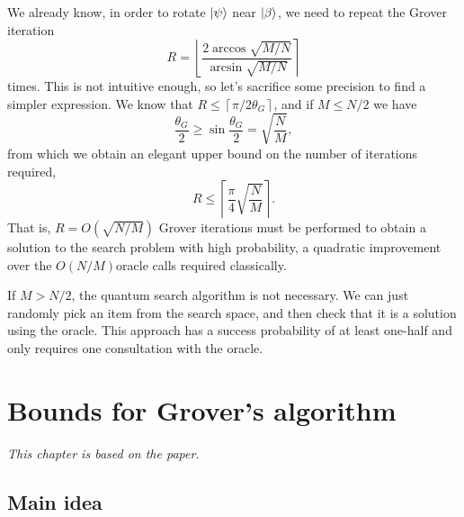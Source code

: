 \documentclass[a4paper,10pt]{book}
\numberwithin{equation}{section}
\begin{document}
We already know, in order to rotate $\ket{\psi}$ near $\ket{\beta}$, we need to repeat the Grover iteration
\begin{equation}\label{eq:IterationsGrover}
    R=\left\lfloor\frac{2\arccos\sqrt{M/N}}{\arcsin\sqrt{M/N}}\right\rceil
\end{equation}
times. This is not intuitive enough, so let's sacrifice some precision to find a simpler expression. We know that $R\leq\left\lceil\pi/2\theta_{G}\right\rceil$, and if $M\leq N/2$ we have
\begin{equation}
    \frac{\theta_{G}}{2}\geq\sin\frac{\theta_{G}}{2}=\sqrt{\frac{N}{M}},
\end{equation}
from which we obtain an elegant upper bound on the number of iterations required,
\begin{equation}
    R\leq\left\lceil\frac{\pi}{4}\sqrt{\frac{N}{M}}\right\rceil.
\end{equation}
That is, $R=O(\sqrt{N/M})$ Grover iterations must be performed to obtain a solution to the search problem with high probability, a quadratic improvement over the $O(N/M)$oracle calls required classically.

If $M>N/2$, the quantum search algorithm is not necessary. We can just randomly pick an item from the search space, and then check that it is a solution using the oracle. This approach has a success probability of at least one-half and only requires one consultation with the oracle.



\chapter{Bounds for Grover's algorithm\label{sec:BoundForGrover}}

\textit{This chapter is based on the paper\cite{2009Exact}.}

\section{Main idea}
\end{document}
